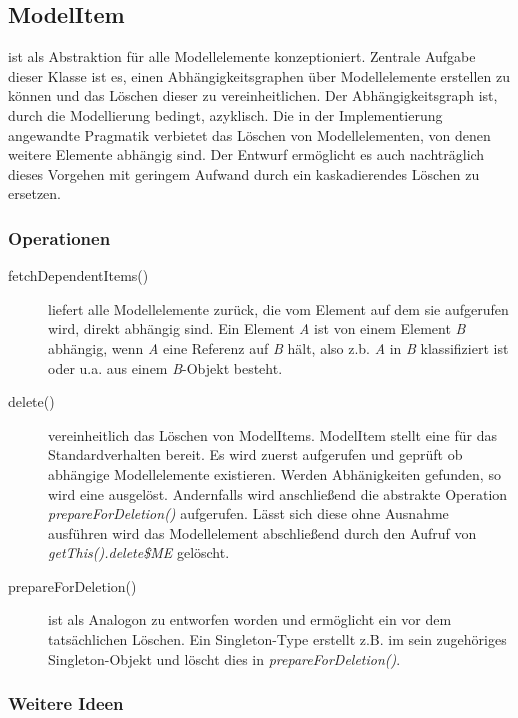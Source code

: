 \subsection{ModelItem}

 ist als Abstraktion für alle Modellelemente konzeptioniert. 
Zentrale Aufgabe dieser Klasse ist es, einen Abhängigkeitsgraphen über Modellelemente erstellen zu können und 
das Löschen dieser zu vereinheitlichen. Der Abhängigkeitsgraph ist, durch die Modellierung bedingt, azyklisch.
Die in der Implementierung angewandte Pragmatik verbietet das Löschen von Modellelementen, von denen weitere Elemente 
abhängig sind. Der Entwurf ermöglicht es auch nachträglich dieses Vorgehen mit geringem Aufwand durch ein kaskadierendes Löschen zu 
ersetzen. 



\subsubsection{Operationen}

\begin{description}
\item[fetchDependentItems()] 
liefert alle Modellelemente zurück, die vom Element auf dem sie aufgerufen wird, direkt abhängig sind.
Ein Element \emph{A} ist von einem Element \emph{B} abhängig, wenn \emph{A} eine Referenz auf \emph{B} hält, also z.b.   
\emph{A} in \emph{B} klassifiziert ist oder u.a. aus einem \emph{B}-Objekt besteht.
 
\item[delete()] vereinheitlich das Löschen von ModelItems. ModelItem stellt eine  für das 
Standardverhalten bereit. Es wird zuerst  aufgerufen und geprüft ob abhängige Modellelemente 
existieren. Werden Abhänigkeiten gefunden, so wird eine  ausgelöst. Andernfalls wird anschließend 
die abstrakte Operation \emph{prepareForDeletion()} aufgerufen. Lässt sich diese ohne Ausnahme ausführen wird das Modellelement 
abschließend durch den Aufruf von \emph{getThis().delete\$ME} gelöscht.

\item[prepareForDeletion()] ist als Analogon zu  entworfen worden und ermöglicht ein 
 vor dem tatsächlichen Löschen. Ein Singleton-Type erstellt z.B. im  sein zugehöriges 
Singleton-Objekt und löscht dies in \emph{prepareForDeletion()}. 
\end{description}


\subsubsection{Weitere Ideen}

